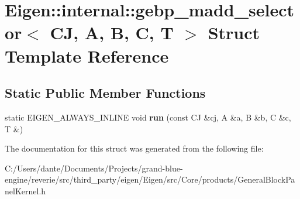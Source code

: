 \hypertarget{struct_eigen_1_1internal_1_1gebp__madd__selector}{}\section{Eigen\+::internal\+::gebp\+\_\+madd\+\_\+selector$<$ CJ, A, B, C, T $>$ Struct Template Reference}
\label{struct_eigen_1_1internal_1_1gebp__madd__selector}
\subsection*{Static Public Member Functions}
\begin{DoxyCompactItemize}
\item 
\mbox{\label{struct_eigen_1_1internal_1_1gebp__madd__selector_ac8ddb995ca21a105b1309c9632b5ca7f}} 
static E\+I\+G\+E\+N\+\_\+\+A\+L\+W\+A\+Y\+S\+\_\+\+I\+N\+L\+I\+NE void {\bfseries run} (const CJ \&cj, A \&a, B \&b, C \&c, T \&)
\end{DoxyCompactItemize}


The documentation for this struct was generated from the following file\+:\begin{DoxyCompactItemize}
\item 
C\+:/\+Users/dante/\+Documents/\+Projects/grand-\/blue-\/engine/reverie/src/third\+\_\+party/eigen/\+Eigen/src/\+Core/products/General\+Block\+Panel\+Kernel.\+h\end{DoxyCompactItemize}
